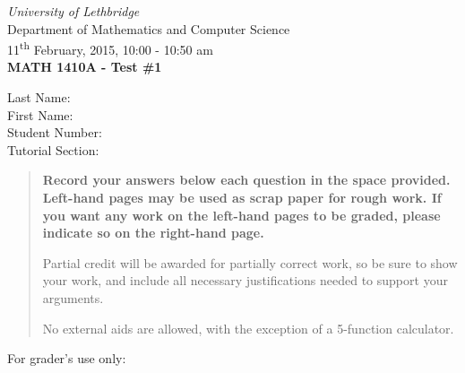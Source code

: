 \documentclass[12pt]{article}
\newcommand{\skipline}{\vspace{12pt}}
\begin{document}
\author{Instructor: Sean Fitzpatrick}
\thispagestyle{plain}
\begin{center}
\emph{University of Lethbridge}\\
Department of Mathematics and Computer Science\\
11\textsuperscript{th} February, 2015, 10:00 - 10:50 am\\
{\bf MATH 1410A - Test \#1}\\
\end{center}
\skipline \skipline \skipline \noindent \skipline
Last Name:\underline{\hspace{50pt}{\bf Solutions}\hspace{248pt}}\\
\skipline
First Name:\underline{\hspace{50pt}{\bf The}\hspace{275pt}}\\
\skipline
Student Number:\underline{\hspace{323pt}}\\
\skipline
Tutorial Section: \underline{\hspace{320pt}}\\


\vspace{0.5in}


\begin{quote}
 {\bf Record your answers below each question in the space provided.    Left-hand pages may be used as scrap paper for rough work.  If you want any work on the left-hand pages to be graded, please indicate so on the right-hand page.
 
 \bigskip
 
Partial credit will be awarded for partially correct work, so be sure to show your work, and include all necessary justifications needed to support your arguments.

\bigskip

No external aids are allowed, with the exception of a 5-function calculator.}
\end{quote}


\vspace{0.5in}

For grader's use only:
\end{document}
